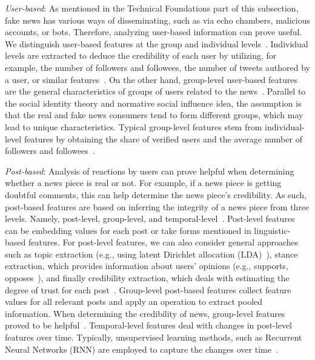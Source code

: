 \begin{description}
    \item{\emph{User-based}:} As mentioned in the Technical Foundations part of this subsection, fake news has various ways of disseminating, such as via echo chambers, malicious accounts, or bots. Therefore, analyzing user-based information can prove useful. We distinguish user-based features at the group and individual levels~\parencite{FakeNewsDetectionOnSocialMediaADataMiningPerspective_Shu}. Individual levels are extracted to deduce the credibility of each user by utilizing, for example, the number of followers and followees, the number of tweets authored by a user, or similar features~\parencite{InformationCredibilityOnTwiter_Castillo}. On the other hand, group-level user-based features are the general characteristics of groups of users related to the news~\parencite{AutomaticDetectionOfRumor_Yang}. Parallel to the social identity theory and normative social influence idea, the assumption is that the real and fake news consumers  tend to form different groups, which may lead to unique characteristics. Typical group-level features stem from individual-level features by obtaining the share of verified users and the average number of followers and followees~\parencite{DetectRumorsUsingTimeSeries_Ma}.
    \item{\emph{Post-based}:} Analysis of reactions by users can prove helpful when determining whether a news piece is real or not. For example, if a news piece is getting doubtful comments, this can help determine the news piece’s credibility. As such, post-based features are based on inferring the integrity of a news piece from three levels. Namely, post-level, group-level, and temporal-level~\parencite{FakeNewsDetectionOnSocialMediaADataMiningPerspective_Shu}. Post-level features can be embedding values for each post or take forms mentioned in linguistic-based features. For post-level features, we can also consider general approaches such as topic extraction (e.g., using latent Dirichlet allocation (LDA)~\parencite{LatentDirichletAllocation_Blei}), stance extraction, which provides information about users’ opinions (e.g., supports, opposes~\parencite{NewsVerificationByExploitingConflictingSocialViewpoints_Jin}), and finally credibility extraction, which deals with estimating the degree of trust for each post~\parencite{InformationCredibilityOnTwiter_Castillo}. Group-level post-based features collect feature values for all relevant posts and apply an operation to extract pooled information. When determining the credibility of news, group-level features proved to be helpful~\parencite{NewsVerificationByExploitingConflictingSocialViewpoints_Jin}. Temporal-level features deal with changes in post-level features over time. Typically, unsupervised learning methods, such as Recurrent Neural Networks (RNN) are employed to capture the changes over time~\parencite{DetectingRumorsFromMicroblogs_Ma}.

\end{description}
